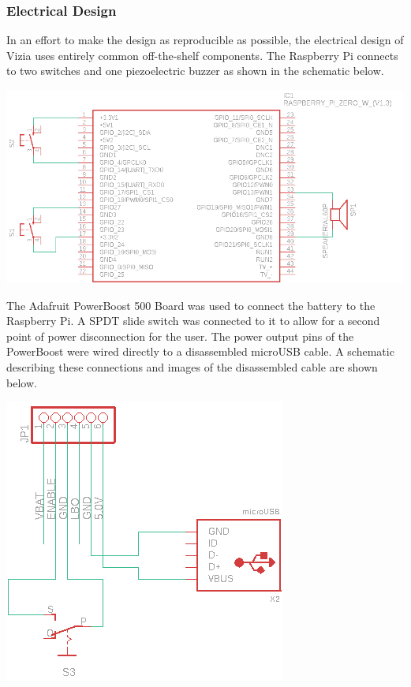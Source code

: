 \documentclass[a4paper,11pt]{article}
\begin{document}
\subsubsection{Electrical Design}
In an effort to make the design as reproducible as possible, the electrical design of Vizia uses entirely common off-the-shelf components. The Raspberry Pi connects to two switches and one piezoelectric buzzer as shown in the schematic below.

\begin{center}
    \includegraphics[scale=1.0]{img/schematics/vizia-rpi.png}
\end{center}

The Adafruit PowerBoost 500 Board was used to connect the battery to the Raspberry Pi. A SPDT slide switch was connected to it to allow for a second point of power disconnection for the user. The power output pins of the PowerBoost were wired directly to a disassembled microUSB cable. A schematic describing these connections and images of the disassembled cable are shown below.

\begin{center}
    \includegraphics[scale=1.0]{img/schematics/vizia-powerboost.png}
\end{center}
\end{document}
